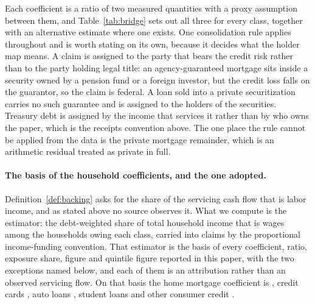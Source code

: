 Each coefficient is a ratio of two measured quantities with a proxy assumption between them, and
Table~\ref{tab:bridge} sets out all three for every class, together with an alternative estimate
where one exists. One consolidation rule applies throughout and is worth stating on its own,
because it decides what the holder map means. A claim is assigned to the party that bears the
credit risk rather than to the party holding legal title: an agency-guaranteed mortgage sits
inside a security owned by a pension fund or a foreign investor, but the credit loss falls on the
guarantor, so the claim is federal. A loan sold into a private securitization carries no such
guarantee and is assigned to the holders of the securities. Treasury debt is assigned by the
income that services it rather than by who owns the paper, which is the receipts convention above.
The one place the rule cannot be applied from the data is the private mortgage remainder, which is
an arithmetic residual treated as private in full.

{\footnotesize
}

\begin{table}[htbp]
\centering
{\footnotesize
}
\caption{The two constructions of the household coefficients, each on its own inputs.
The construction effect holds the survey fixed and moves from the coverage share to the wage
share of servicing income. The source effect holds the construction fixed and moves from the
figure published earlier to the same quantity computed on the survey used here. For home
mortgages the source effect is the larger of the two, which is why the earlier coefficient
could not be reproduced from the inputs printed beside it.}
\label{tab:basiscompare}
\end{table}

\paragraph{The basis of the household coefficients, and the one adopted.}
Definition~\ref{def:backing} asks for the share of the servicing cash flow that is labor income,
and as stated above no source observes it. What we compute is the estimator: the debt-weighted
share of total household income that is wages among the households owing each class, carried into
claims by the proportional income-funding convention. That estimator is the basis of every
coefficient, ratio, exposure share, figure and quintile figure reported in this paper, with the
two exceptions named below, and each of them is an attribution rather than an observed servicing
flow. On that
basis the home mortgage coefficient is , credit cards
, auto loans , student loans
 and other consumer credit .

